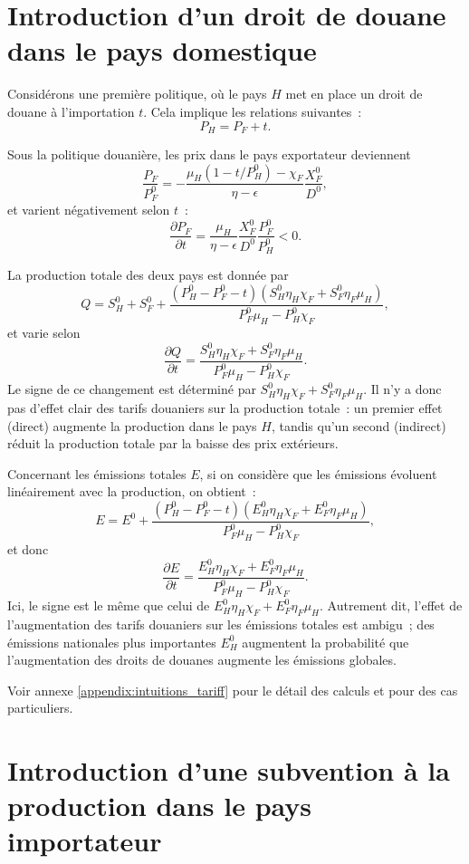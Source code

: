\section{Introduction d'un droit de douane dans le pays domestique}\label{Sec_tariff}

Considérons une première politique, où le pays $H$ met en place un droit de douane à l'importation $t$. Cela implique les relations suivantes~:
$$
    P_H = P_F + t.
$$

Sous la politique douanière, les prix dans le pays exportateur deviennent
$$
    \frac{P_F}{P_F^0} = -\frac{\mu_H (1 - t/P_H^0) - \chi_F}{\eta - \epsilon}\frac{X_F^0}{D^0},
$$
et varient négativement selon $t$~:
$$
    \frac{\partial P_F}{\partial t} = \frac{\mu_H}{\eta - \epsilon} \frac{X_F^0}{D^0} \frac{P_F^0}{P_H^0} < 0.
$$

La production totale des deux pays est donnée par
$$
    Q = S_H^0 + S_F^0 + \frac{(P_H^0 - P_F^0 - t)(S_H^0 \eta_H \chi_F + S_F^0 \eta_F \mu_H)}{P_F^0 \mu_H - P_H^0 \chi_F},
$$
et varie selon
$$
    \frac{\partial Q}{\partial t} = \frac{S_H^0 \eta_H \chi_F + S_F^0 \eta_F \mu_H}{P_F^0 \mu_H - P_H^0 \chi_F}.
$$
Le signe de ce changement est déterminé par $S_H^0 \eta_H \chi_F + S_F^0 \eta_F \mu_H$. Il n'y a donc pas d'effet clair des tarifs douaniers sur la production totale~: un premier effet (direct) augmente la production dans le pays $H$, tandis qu'un second (indirect) réduit la production totale par la baisse des prix extérieurs.

Concernant les émissions totales $E$, si on considère que les émissions évoluent linéairement avec la production, on obtient~:
$$
    E = E^0 + \frac{(P_H^0 - P_F^0 - t)(E_H^0 \eta_H \chi_F + E_F^0 \eta_F \mu_H)}{P_F^0 \mu_H - P_H^0 \chi_F},
$$
et donc
$$
    \frac{\partial E}{\partial t} = \frac{E_H^0 \eta_H \chi_F + E_F^0 \eta_F \mu_H}{P_F^0 \mu_H - P_H^0 \chi_F}.
$$
Ici, le signe est le même que celui de $E_H^0 \eta_H \chi_F + E_F^0 \eta_F \mu_H$. Autrement dit, l'effet de l'augmentation des tarifs douaniers sur les émissions totales est ambigu~; des émissions nationales plus importantes $E_H^0$ augmentent la probabilité que l'augmentation des droits de douanes augmente les émissions globales.

Voir annexe \ref{appendix:intuitions_tariff} pour le détail des calculs et pour des cas particuliers.

\section{Introduction d'une subvention à la production dans le pays importateur}\label{Sec_subvention}

